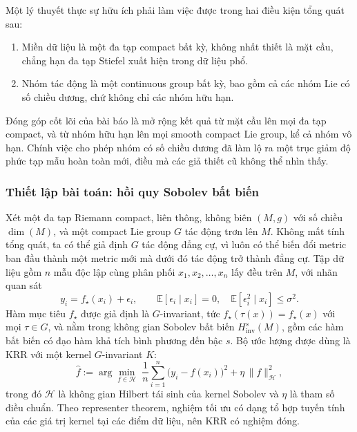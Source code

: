 Một lý thuyết thực sự hữu ích phải làm việc được trong hai điều kiện tổng quát sau:
\begin{enumerate}
    \item Miền dữ liệu là một đa tạp compact bất kỳ, không nhất thiết là mặt cầu, chẳng hạn đa tạp Stiefel xuất hiện trong dữ liệu phổ.
    \item Nhóm tác động là một continuous group bất kỳ, bao gồm cả các nhóm Lie có số chiều dương, chứ không chỉ các nhóm hữu hạn.
\end{enumerate}
 
Đóng góp cốt lõi của bài báo là mở rộng kết quả từ mặt cầu lên mọi đa tạp compact, và từ nhóm hữu hạn lên mọi smooth compact Lie group, kể cả nhóm vô hạn. Chính việc cho phép nhóm có số chiều dương đã làm lộ ra một trục giảm độ phức tạp mẫu hoàn toàn mới, điều mà các giả thiết cũ không thể nhìn thấy.
 
\subsubsection{Thiết lập bài toán: hồi quy Sobolev bất biến}
 
Xét một đa tạp Riemann compact, liên thông, không biên $(M, g)$ với số chiều $\dim(M)$, và một compact Lie group $G$ tác động trơn lên $M$. Không mất tính tổng quát, ta có thể giả định $G$ tác động đẳng cự, vì luôn có thể biến đổi metric ban đầu thành một metric mới mà dưới đó tác động trở thành đẳng cự. Tập dữ liệu gồm $n$ mẫu độc lập cùng phân phối $x_1, x_2, \ldots, x_n$ lấy đều trên $M$, với nhãn quan sát
\begin{equation}
    y_i = f_{\star}(x_i) + \epsilon_i, \qquad \mathbb{E}[\epsilon_i \mid x_i] = 0, \quad \mathbb{E}[\epsilon_i^2 \mid x_i] \le \sigma^2 .
\end{equation}
Hàm mục tiêu $f_{\star}$ được giả định là $G$-invariant, tức $f_{\star}(\tau(x)) = f_{\star}(x)$ với mọi $\tau \in G$, và nằm trong không gian Sobolev bất biến $H^s_{\text{inv}}(M)$, gồm các hàm bất biến có đạo hàm khả tích bình phương đến bậc $s$. Bộ ước lượng được dùng là KRR với một kernel $G$-invariant $K$:
\begin{equation}
    \hat{f} := \arg\min_{f \in \mathcal{H}} \; \frac{1}{n}\sum_{i=1}^{n}\bigl(y_i - f(x_i)\bigr)^2 + \eta \, \|f\|_{\mathcal{H}}^2 ,
\end{equation}
trong đó $\mathcal{H}$ là không gian Hilbert tái sinh của kernel Sobolev và $\eta$ là tham số điều chuẩn. Theo representer theorem, nghiệm tối ưu có dạng tổ hợp tuyến tính của các giá trị kernel tại các điểm dữ liệu, nên KRR có nghiệm đóng.
 
